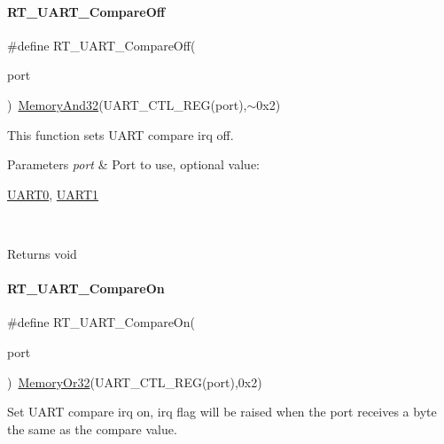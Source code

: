 \paragraph{\texorpdfstring{R\+T\+\_\+\+U\+A\+R\+T\+\_\+\+Compare\+Off}{RT\_UART\_CompareOff}}
{\footnotesize\ttfamily \#define R\+T\+\_\+\+U\+A\+R\+T\+\_\+\+Compare\+Off(\begin{DoxyParamCaption}\item[{}]{port }\end{DoxyParamCaption})~\mbox{\hyperlink{a00026_ad87cedffcaadc51db22594fce55173d4}{Memory\+And32}}(U\+A\+R\+T\+\_\+\+C\+T\+L\+\_\+\+R\+EG(port),$\sim$0x2)}



This function sets U\+A\+RT compare irq off. 


\begin{DoxyParams}{Parameters}
{\em port} & Port to use, optional value\+:
\begin{DoxyCode}
\mbox{\hyperlink{a00098_a0508661f121639ffdee7de2353a0def2}{UART0}}, \mbox{\hyperlink{a00098_a8d69bf04d07af4fbbab5a8bd291f65ff}{UART1}}
\end{DoxyCode}
 \\
\hline
\end{DoxyParams}
\begin{DoxyReturn}{Returns}
void 
\end{DoxyReturn}
\mbox{\label{a00098_aab5e3da11e9f9d531cab23aa451d2356}} 
\paragraph{\texorpdfstring{R\+T\+\_\+\+U\+A\+R\+T\+\_\+\+Compare\+On}{RT\_UART\_CompareOn}}
{\footnotesize\ttfamily \#define R\+T\+\_\+\+U\+A\+R\+T\+\_\+\+Compare\+On(\begin{DoxyParamCaption}\item[{}]{port }\end{DoxyParamCaption})~\mbox{\hyperlink{a00026_a27874a97deab7cecdde5ddecf466e31e}{Memory\+Or32}}(U\+A\+R\+T\+\_\+\+C\+T\+L\+\_\+\+R\+EG(port),0x2)}



Set U\+A\+RT compare irq on, irq flag will be raised when the port receives a byte the same as the compare value. 


